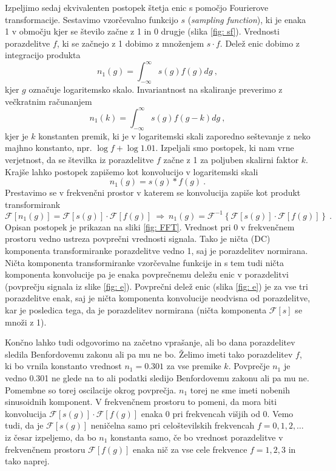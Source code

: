 \documentclass[11pt, oneside]{article}
\theoremstyle{definition}
\begin{document}
Izpeljimo sedaj ekvivalenten postopek štetja enic s pomočjo Fourierove transformacije.
Sestavimo vzorčevalno funkcijo $s$ (\emph{sampling function}), ki je enaka 1 v območju kjer se
število začne z 1 in 0 drugje (slika \ref{fig: sf}). Vrednosti porazdelitve $f$, ki se začnejo z 1 dobimo z
množenjem $s \cdot f$. Delež enic dobimo z integracijo produkta
\begin{equation}
    n_1(g) = \int_{-\infty}^{\infty} s(g) f(g) dg \>,
\end{equation}
kjer $g$ označuje logaritemsko skalo. Invariantnost na skaliranje preverimo z večkratnim računanjem
\begin{equation}
    n_1(k) = \int_{-\infty}^{\infty} s(g) f(g - k) dg \>,
\end{equation}
kjer je $k$ konstanten premik, ki je v logaritemski skali zaporedno seštevanje z neko majhno konstanto, npr. $\log f +\log1.01$.
Izpeljali smo postopek, ki nam vrne verjetnost, da se številka iz porazdelitve $f$ začne z 1 za poljuben skalirni
faktor $k$. Krajše lahko postopek zapišemo kot konvolucijo v logaritemski skali
\begin{equation}
    n_1(g) = s(g) * f(g) \>.
\end{equation}
Prestavimo se v frekvenčni prostor v katerem se konvolucija zapiše kot produkt transformirank
\begin{equation}
    \mathcal {F}\left [ n_1(g) \right ] = \mathcal{F} [s(g)] \cdot \mathcal{F} [f(g)] \> \Rightarrow \>
    n_1(g) = \mathcal{F}^{-1} \left \{ \mathcal{F} [s(g)] \cdot \mathcal{F} [f(g)] \right \} \>.
\end{equation}
Opisan postopek je prikazan na sliki \ref{fig: FFT}. Vrednost pri 0 v frekvenčnem prostoru vedno ustreza povprečni
vrednosti signala. Tako je ničta (DC) komponenta transformiranke porazdelitve vedno 1, saj je porazdelitev normirana.
Ničta komponenta transformiranke vzorčevalne funkcije in s tem tudi ničta komponenta konvolucije pa je
enaka povprečnemu deležu enic v porazdelitvi (povprečju signala iz slike \ref{fig: e}).
Povprečni delež enic (slika \ref{fig: e}) je za vse tri porazdelitve enak, saj je
ničta komponenta konvolucije neodvisna od porazdelitve, kar je posledica tega, da je porazdelitev normirana
(ničta komponenta $\mathcal{F}[s]$ se množi z 1).

Končno lahko tudi odgovorimo na začetno vprašanje, ali bo dana porazdelitev sledila Benfordovemu zakonu ali pa mu ne bo.
Želimo imeti tako porazdelitev $f$, ki bo vrnila konstanto vrednost $n_1=0.301$ za vse premike $k$.
Povprečje $n_1$ je vedno 0.301 ne glede na to ali podatki sledijo Benfordovemu zakonu ali pa mu ne.
Pomembne so torej oscilacije okrog povprečja. $n_1$ torej ne sme imeti nobenih sinusoidnih komponent.
V frekvenčnem prostoru to pomeni, da mora biti konvolucija $\mathcal{F} [s(g)] \cdot \mathcal{F} [f(g)]$ enaka 0
pri frekvencah višjih od 0. Vemo tudi, da je $\mathcal{F}[s(g)]$ neničelna samo pri celoštevilskih
frekvencah $f=0,1,2,\ldots$ iz česar izpeljemo, da bo $n_1$ konstanta samo, če bo vrednost
porazdelitve v frekvenčnem prostoru $\mathcal{F} [f(g)]$ enaka nič za vse cele frekvence $f=1,2,3$ in tako naprej.
\end{document}
